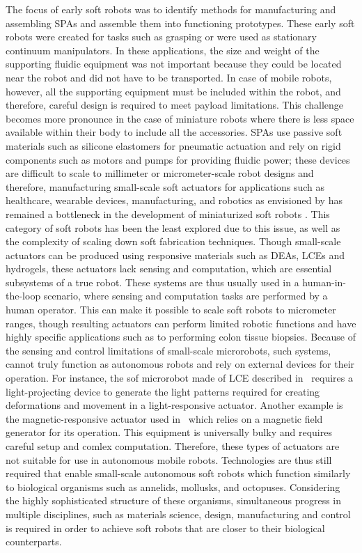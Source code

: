 The focus of early soft robots was to identify methods for manufacturing and assembling SPAs and assemble them into functioning prototypes. These early soft robots were created for tasks such as grasping or were used as stationary continuum manipulators. In these applications, the size and weight of the supporting fluidic equipment was not important because they could be located near the robot and did not have to be transported. In case of mobile robots, however, all the supporting equipment must be included within the robot, and therefore, careful design is required to meet payload limitations. This challenge becomes more pronounce in the case of miniature robots where there is less space available within their body to include all the accessories. SPAs use passive soft materials such as silicone elastomers for pneumatic actuation and rely on rigid components such as motors and pumps for providing fluidic power; these devices are difficult to scale to millimeter or micrometer-scale robot designs and therefore, manufacturing small-scale soft actuators for applications such as healthcare, wearable devices, manufacturing, and robotics as envisioned by \cite{Hines2017} has remained a bottleneck in the development of miniaturized soft robots \cite{Majidi2019}. This category of soft robots has been the least explored due to this issue, as well as the complexity of scaling down soft fabrication techniques. Though small-scale actuators can be produced using responsive materials such as DEAs, LCEs and hydrogels, these actuators lack sensing and computation, which are essential subsystems of a true robot. These systems are thus usually used in a human-in-the-loop scenario, where sensing and computation tasks are performed by a human operator. This can make it possible to scale soft robots to micrometer ranges, though resulting actuators can perform limited robotic functions and have highly specific applications such as to performing colon tissue biopsies. Because of the sensing and control limitations of small-scale microrobots, such systems, cannot truly function as autonomous robots and rely on external devices for their operation. For instance, the sof microrobot made of LCE described in~\cite{Palagi2016} requires a light-projecting device to generate the light patterns required for creating deformations and movement in a light-responsive actuator. Another example is the magnetic-responsive actuator used in~\cite{Kim2018} which relies on a magnetic field generator for its operation. This equipment is universally bulky and requires careful setup and comlex computation. Therefore, these types of actuators are not suitable for use in autonomous mobile robots. Technologies are thus still required that enable small-scale autonomous soft robots which function similarly to biological organisms such as annelids, mollusks, and octopuses. Considering the highly sophisticated structure of these organisms, simultaneous progress in multiple disciplines, such as materials science, design, manufacturing and control is required in order to achieve soft robots that are closer to their biological counterparts.

